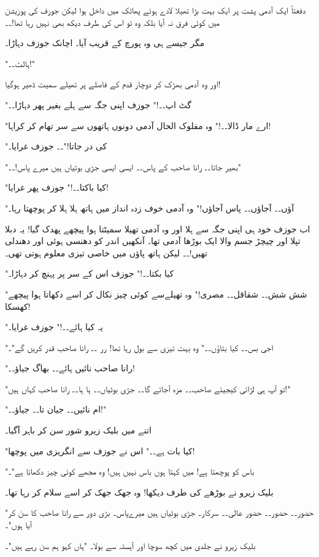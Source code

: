 دفعتاً ایک آدمی پشت پر ایک بہت بڑا تھیلا لادے ہوئے پھاٹک میں داخل ہوا لیکن جوزف کی پوزیشن میں کوئی فرق نہ آیا بلکہ وہ تو اس کی طرف دیکھ بھی نہیں رہا تھا!۔۔

مگر جیسے ہی وہ پورچ کے قریب آیا۔ اچانک جوزف دہاڑا۔

"ہالٹ۔۔!"

اور وہ آدمی بھڑک کر دوچار قدم کے فاصلے پر تھیلے سمیت ڈھیر ہوگیا!

"گٹ اپ۔۔!" جوزف اپنی جگہ سے ہلے بغیر پھر دہاڑا۔۔

"ارے مار ڈالا۔۔!" وہ مفلوک الحال آدمی دونوں ہاتھوں سے سر تھام کر کراہا!

"کی در جاتا!"۔۔ جوزف غرایا۔

"بھیر جاتا۔۔ رانا صاحب کے پاس۔۔ ایسی ایسی جڑی بوٹیاں ہیں میرے پاس!۔۔"

"کیا باکتا۔۔!" جوزف پھر غرایا!

"آؤں۔۔ آجاؤں۔۔ پاس آجاؤں!" وہ آدمی خوف زدہ انداز میں ہاتھ ہلا ہلا کر پوچھتا رہا۔

اب جوزف خود ہی اپنی جگہ سے ہلا اور وہ آدمی تھیلا سمیٹتا ہوا پیچھے پھدک گیا! یہ دبلا تپلا اور چیچڑ جسم والا ایک بوڑھا آدمی تھا۔ آنکھیں اندر کو دھنسی ہوئی اور دھندلی تھیں!۔۔ لیکن ہاتھ پاؤں میں خاصی تیزی معلوم ہوتی تھی۔

"کیا بکتا۔۔!" جوزف اس کے سر پر پہنچ کر دہاڑا۔

"شش شش۔۔ شقاقل۔۔ مصری!" وہ تھیلےسے کوئی چیز نکال کر اسے دکھاتا ہوا پیچھے کھسکا!

"یہ کیا ہائے۔۔!" جوزف غرایا۔

"اجی بس۔۔ کیا بتاؤں۔۔" وہ بہت تیزی سے بول رہا تھا! رر ۔۔ رانا صاحب قدر کریں گے"۔

"رانا صاحب نائیں ہائے۔۔ بھاگ جیاؤ۔۔!

"تو آپ ہی لڑائی کیجیئے صاحب۔۔ مزہ آجائے گا۔۔ جڑی بوٹیاں۔۔ ہا ہا۔۔ رانا صاحب کہاں ہیں!"

"ام نائیں۔۔ جیان تا۔۔ جیاؤ۔۔!"

اتنے میں بلیک زیرو شور سن کر باہر آگیا۔

"کیا بات ہے۔۔" اس نے جوزف سے انگریزی میں پوچھا!

"باس کو پوچھتا ہے! میں کہتا ہوں باس نہیں ہیں! وہ مجھے کوئی چیز دکھاتا ہے"۔

بلیک زیرو نے بوڑھے کی طرف دیکھا! وہ جھک جھک کر اسے سلام کر رہا تھا۔

"حضور۔۔ حضور۔۔ حضور عالی۔۔ سرکار۔ جڑی بوٹیاں ہیں میرےپاس۔ بڑی دور سے رانا صاحب کا سن کر آیا ہوں"۔

بلیک زیرو نے جلدی میں کچھ سوچا اور آہستہ سے بولا۔ "ہاں کہو ہم سن رہے ہیں"۔

